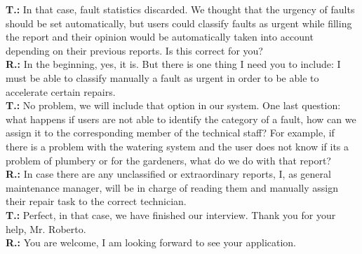 \textbf{T.:} In that case, fault statistics discarded. We thought that the urgency of faults should be set automatically, but users could classify faults as urgent while filling the report and their opinion would be automatically taken into account depending on their previous reports. Is this correct for you?\\
\textbf{R.:} In the beginning, yes, it is. But there is one thing I need you to include: I must be able to classify manually a fault as urgent in order to be able to accelerate certain repairs.\\

\textbf{T.:} No problem, we will include that option in our system. One last question: what happens if users are not able to identify the category of a fault, how can we assign it to the corresponding member of the technical staff? For example, if there is a problem with the watering system and the user does not know if its a problem of plumbery or for the gardeners, what do we do with that report?\\
\textbf{R.:} In case there are any unclassified or extraordinary reports, I, as general maintenance manager, will be in charge of reading them and manually assign their repair task to the correct technician.\\

\textbf{T.:} Perfect, in that case, we have finished our interview. Thank you for your help, Mr. Roberto.\\
\textbf{R.:} You are welcome, I am looking forward to see your application.\\
